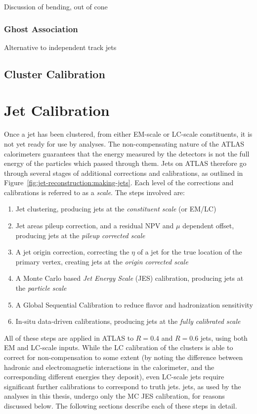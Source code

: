 Discussion of bending, out of cone

\subsubsection{Ghost Association}

Alternative to independent track jets

\subsection{Cluster Calibration}

\section{Jet Calibration}

Once a jet has been clustered, from either EM-scale or LC-scale constituents, it is not yet ready for use by analyses. The non-compensating nature of the ATLAS calorimeters guarantees that the energy measured by the detectors is not the full energy of the particles which passed through them. Jets on ATLAS therefore go through several stages of additional corrections and calibrations, as outlined in Figure~\ref{fig:jet-reconstruction:making-jets}. Each level of the corrections and calibrations is referred to as a \textit{scale}. The steps involved are:

\begin{enumerate}
	\item Jet clustering, producing jets at the \textit{constituent scale} (or EM/LC)
	\item Jet areas pileup correction, and a residual NPV and $\mu$ dependent offset, producing jets at the \textit{pileup corrected scale}
	\item A jet origin correction, correcting the $\eta$ of a jet for the true location of the primary vertex, creating jets at the \textit{origin corrected scale}
	\item A Monte Carlo based \textit{Jet Energy Scale} (JES) calibration, producing jets at the \textit{particle scale}
	\item A Global Sequential Calibration to reduce flavor and hadronization sensitivity
	\item In-situ data-driven calibrations, producing jets at the \textit{fully calibrated scale}
\end{enumerate}

All of these steps are applied in ATLAS to $R=0.4$ and $R=0.6$ jets, using both EM and LC-scale inputs. While the LC calibration of the clusters is able to correct for non-compensation to some extent (by noting the difference between hadronic and electromagnetic interactions in the calorimeter, and the corresponding different energies they deposit), even LC-scale jets require significant further calibrations to correspond to truth jets. \LargeR jets, as used by the analyses in this thesis, undergo only the MC JES calibration, for reasons discussed below. The following sections describe each of these steps in detail.

